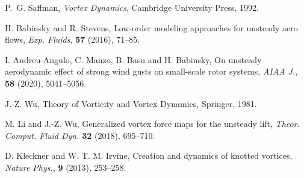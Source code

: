 \begin{thebibliography}{99}

P.~G. Saffman,
\textit{Vortex Dynamics},
Cambridge University Press, 1992.

H. Babinsky and R. Stevens,
Low-order modeling approaches for unsteady aero flows,
\textit{Exp. Fluids}, \textbf{57} (2016), 71--85.

I. Andreu-Angulo, C. Manzo, B. Basu and H. Babinsky,
On unsteady aerodynamic effect of strong wind gusts on small-scale rotor systems,
\textit{AIAA J.}, \textbf{58} (2020), 5041--5056.

J.-Z. Wu,
Theory of Vorticity and Vortex Dynamics,
Springer, 1981.

M. Li and J.-Z. Wu,
Generalized vortex force maps for the unsteady lift,
\textit{Theor. Comput. Fluid Dyn.} \textbf{32} (2018), 695--710.

D. Kleckner and W. T. M. Irvine,
Creation and dynamics of knotted vortices,
\textit{Nature Phys.}, \textbf{9} (2013), 253--258.

\end{thebibliography}
